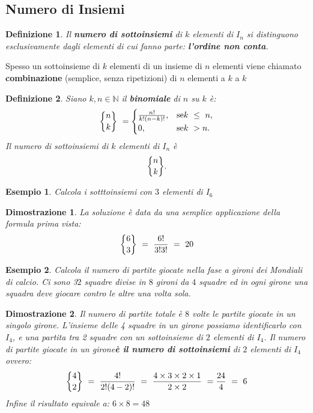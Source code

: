 \documentclass[12pt, a4paper]{article}
\theoremstyle{break}
\newtheorem{defn}{Definizione}
\theoremstyle{lemma}
\theoremstyle{lemma}
\newtheorem{dimo}{Dimostrazione}
\theoremstyle{lemma}
\newtheorem{esem}{Esempio}
\newcommand*{\bfrac}[2]{\genfrac{\lbrace}{\rbrace}{0pt}{}{#1}{#2}}
\begin{document}
\subsection{Numero di Insiemi}
\begin{defn}
	Il \textbf{numero di sottoinsiemi} di $k$ elementi di $I_n$ si distinguono esclusivamente dagli elementi di cui fanno parte: \textbf{l'ordine non conta}.
\end{defn}

Spesso un sottoinsieme di $k$ elementi di un insieme di $n$ elementi viene chiamato \textbf{combinazione} (semplice, senza ripetizioni) di $n$ elementi a $k$ a $k$

\begin{defn}
	Siano $k,n \in \mathbb{N}$ il \textbf{binomiale} di $n$ su $k$ è:
	\begin{equation}
		\bfrac{n}{k}\ =
		\begin{cases}
			\frac{n!}{k!(n-k)!}, & \mbox{se} k\ \leq\ n,\\
			0, 		    & \mbox{se} k\ > n.
		\end{cases}
	\end{equation}
	Il numero di sottoinsiemi di $k$ elementi di $I_n$ è 
	\begin{equation}
		\bfrac{n}{k}.
	\end{equation}
\end{defn}


\begin{esem}
	Calcola i sotttoinsiemi con $3$ elementi di $I_6$
\end{esem}

\begin{dimo}
	La soluzione è data da una semplice applicazione della formula prima vista:
	\begin{equation}
		\bfrac{6}{3}\ =\ \frac{6!}{3!3!}\ =\ 20
	\end{equation}
\end{dimo}


\begin{esem}
	Calcola il numero di partite giocate nella fase a gironi dei Mondiali di calcio. Ci sono 3$2$ squadre divise in $8$ gironi da $4$ squadre ed in ogni girone una squadra deve giocare contro le altre una volta sola.
\end{esem}

\begin{dimo}
	Il numero di partite totale è $8$ volte le partite giocate in un singolo girone.
	L'insieme delle 4 squadre in un girone possiamo identificarlo con $I_4$, e una partita tra 2 squadre con un sottoinsieme di $2$ elementi di $I_4$. Il numero di partite giocate in un girone\textbf{è il numero di sottoinsiemi} di $2$ elementi di $I_4$ ovvero:
	\begin{equation}
		\bfrac{4}{2}\ =\ \frac{4!}{2!(4-2)! }\ =\ \frac{4\times 3\times 2\times 1}{2\times 2}\ = \frac{24}{4}\ =\ 6
	\end{equation}
	Infine il risultato equivale a: $ 6 \times 8 = 48$
\end{dimo}
\end{document}
